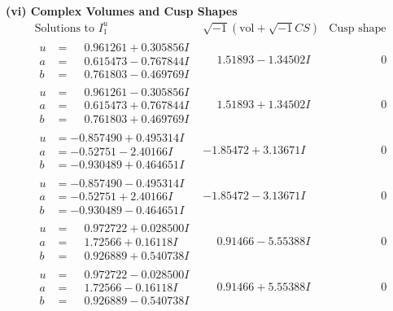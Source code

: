 \documentclass[1p]{elsarticle_modified}
\theoremstyle{definition}
\newcommand{\I}{\sqrt{-1}}
\begin{document}
\newpage\flushleft \textbf{(vi) Complex Volumes and Cusp Shapes}
$$\begin{array}{c|c|c}  
\text{Solutions to }I^u_{1}& \I (\text{vol} + \sqrt{-1}CS) & \text{Cusp shape}\\
 \hline 
\begin{aligned}
u &= \phantom{-}0.961261 + 0.305856 I \\
a &= \phantom{-}0.615473 - 0.767844 I \\
b &= \phantom{-}0.761803 - 0.469769 I\end{aligned}
 & \phantom{-}1.51893 - 1.34502 I & \phantom{-0.000000 } 0 \\ \hline\begin{aligned}
u &= \phantom{-}0.961261 - 0.305856 I \\
a &= \phantom{-}0.615473 + 0.767844 I \\
b &= \phantom{-}0.761803 + 0.469769 I\end{aligned}
 & \phantom{-}1.51893 + 1.34502 I & \phantom{-0.000000 } 0 \\ \hline\begin{aligned}
u &= -0.857490 + 0.495314 I \\
a &= -0.52751 - 2.40166 I \\
b &= -0.930489 + 0.464651 I\end{aligned}
 & -1.85472 + 3.13671 I & \phantom{-0.000000 } 0 \\ \hline\begin{aligned}
u &= -0.857490 - 0.495314 I \\
a &= -0.52751 + 2.40166 I \\
b &= -0.930489 - 0.464651 I\end{aligned}
 & -1.85472 - 3.13671 I & \phantom{-0.000000 } 0 \\ \hline\begin{aligned}
u &= \phantom{-}0.972722 + 0.028500 I \\
a &= \phantom{-}1.72566 + 0.16118 I \\
b &= \phantom{-}0.926889 + 0.540738 I\end{aligned}
 & \phantom{-}0.91466 - 5.55388 I & \phantom{-0.000000 } 0 \\ \hline\begin{aligned}
u &= \phantom{-}0.972722 - 0.028500 I \\
a &= \phantom{-}1.72566 - 0.16118 I \\
b &= \phantom{-}0.926889 - 0.540738 I\end{aligned}
 & \phantom{-}0.91466 + 5.55388 I & \phantom{-0.000000 } 0 \\ \hline\begin{aligned}

\end{aligned}
\end{array}$$
\end{document}
